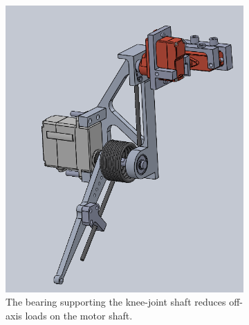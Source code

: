 \begin{figure}[h!]
    \centering
    \begin{subfigure}[b]{0.45\textwidth}
        \includegraphics[width=\textwidth]{Images/CAD_leg_inside_bent.png}
        \caption{The bearing supporting the knee-joint shaft reduces off-axis loads on the motor shaft.}
        \label{fig:image1}
    \end{subfigure}
    \hfill
    \begin{subfigure}[b]{0.45\textwidth}

\end{subfigure}
\end{figure}
